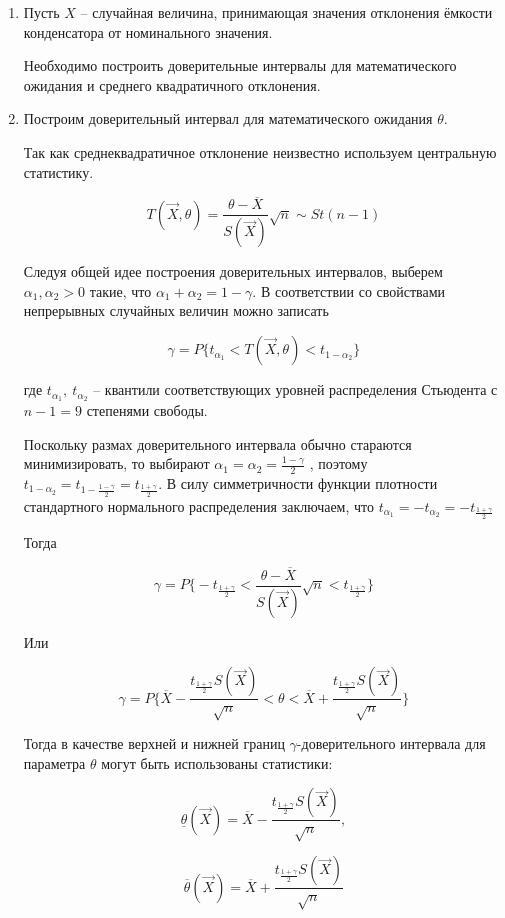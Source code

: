 \begin{enumerate}
\item Пусть $X$ -- случайная величина, принимающая значения отклонения ёмкости конденсатора от номинального значения. 

Необходимо построить доверительные интервалы для математического ожидания и среднего квадратичного отклонения.

\item Построим доверительный интервал для математического ожидания $\theta$. 

Так как среднеквадратичное отклонение неизвестно используем центральную статистику. 

$$T(\vec X, \theta)=\frac{\theta-\overline X}{S(\vec X)}\sqrt{n} \sim St(n-1)$$

Следуя общей идее построения доверительных интервалов, выберем $\alpha_1,\alpha_2 > 0$ такие, что $\alpha_1+\alpha_2 = 1- \gamma$. В соответствии со свойствами непрерывных случайных величин можно записать

$$\gamma=P\{t_{\alpha_1}<T(\vec X, \theta)<t_{1-\alpha_2}\}$$

где $t_{\alpha_1},~t_{\alpha_2}$ -- квантили соответствующих уровней распределения Стьюдента с $n-1=9$ степенями свободы. 

Поскольку размах доверительного интервала обычно стараются минимизировать, то выбирают
$\alpha_1=\alpha_2=\frac{1-\gamma}{2}$ , поэтому $t_{1-\alpha_2}=t_{1-\frac{1-\gamma}{2}}=t_{\frac{1+\gamma}{2}}$. В силу симметричности функции плотности
стандартного нормального распределения заключаем, что $t_{\alpha_1}=-t_{\alpha_2}=-t_{\frac{1+\gamma}{2}}$ 

Тогда

$$\gamma=P\bigg\{-t_{\frac{1+\gamma}{2}}<\frac{\theta-\overline X}{S(\vec X)}\sqrt{n}<t_{\frac{1+\gamma}{2}}\bigg\}$$

Или

$$\gamma=P\bigg\{\overline X-\frac{t_{\frac{1+\gamma}{2}}S(\vec X)}{\sqrt{n}}<\theta<\overline X+\frac{t_{\frac{1+\gamma}{2}}S(\vec X)}{\sqrt{n}}\bigg\}$$

Тогда в качестве верхней и нижней границ $\gamma$-доверительного интервала для параметра $\theta$ могут быть использованы статистики:

$$\underline\theta(\vec X)=\overline X-\frac{t_{\frac{1+\gamma}{2}}S(\vec X)}{\sqrt{n}},$$

$$\overline\theta(\vec X)=\overline X+\frac{t_{\frac{1+\gamma}{2}}S(\vec X)}{\sqrt{n}}$$


\end{enumerate}
